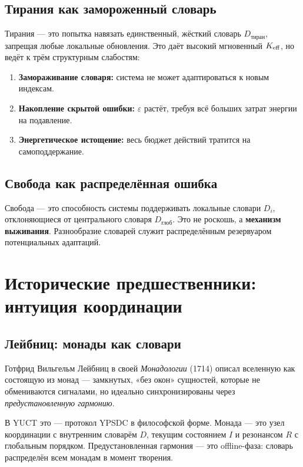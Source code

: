 \documentclass[12pt,a4paper]{article}
\newcommand{\eps}{\varepsilon}
\begin{document}
	\subsection{Тирания как замороженный словарь}
	
	Тирания — это попытка навязать единственный, жёсткий словарь \(D_{\text{тиран}}\), запрещая любые локальные обновления. Это даёт высокий мгновенный \(\Keff\), но ведёт к трём структурным слабостям:
	
	\begin{enumerate}
		\item \textbf{Замораживание словаря:} система не может адаптироваться к новым индексам.
		\item \textbf{Накопление скрытой ошибки:} \(\eps\) растёт, требуя всё больших затрат энергии на подавление.
		\item \textbf{Энергетическое истощение:} весь бюджет действий тратится на самоподдержание.
	\end{enumerate}
	
	\subsection{Свобода как распределённая ошибка}
	
	Свобода — это способность системы поддерживать локальные словари \(D_i\), отклоняющиеся от центрального словаря \(D_{\text{глоб}}\). Это не роскошь, а \textbf{механизм выживания}. Разнообразие словарей служит распределённым резервуаром потенциальных адаптаций.
	
	\section{Исторические предшественники: интуиция координации}
	
	\subsection{Лейбниц: монады как словари}
	
	Готфрид Вильгельм Лейбниц в своей \emph{Монадологии} (1714) описал вселенную как состоящую из монад — замкнутых, «без окон» сущностей, которые не обмениваются сигналами, но идеально синхронизированы через \emph{предустановленную гармонию}.
	
	В YUCT это — протокол YPSDC в философской форме. Монада — это узел координации с внутренним словарём \(D\), текущим состоянием \(I\) и резонансом \(R\) с глобальным порядком. Предустановленная гармония — это offline-фаза: словарь распределён всем монадам в момент творения.
	
\end{document}
